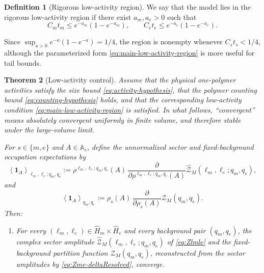 \documentclass[dvipsnames,a4paper]{article}
\numberwithin{equation}{section}
\newtheorem{theorem}{Theorem}[section]
\theoremstyle{definition}
\newtheorem{definition}[theorem]{Definition}
\theoremstyle{remark}
\begin{document}
\begin{definition}[Rigorous low-activity region]
	\label{def:low-activity-region}
	We say that the model lies in the rigorous low-activity region if there exist
	\(a_m,a_e>0\) such that
	\begin{equation}
		C_m t_m \le e^{-a_m}(1-e^{-a_m}),
		\qquad
		C_e t_e \le e^{-a_e}(1-e^{-a_e}).
		\label{eq:main-low-activity-region}
	\end{equation}
\end{definition}

Since \(\sup_{a>0}e^{-a}(1-e^{-a})=1/4\), the region is nonempty whenever
\(C_s t_s<1/4\), although the parameterized form
\eqref{eq:main-low-activity-region} is more useful for tail bounds.



\begin{theorem}[Low-activity control]
	\label{thm:low-activity-region}
	Assume that the physical one-polymer activities satisfy the size bound
	\eqref{eq:activity-hypothesis}, that the polymer counting bound
	\eqref{eq:counting-hypothesis} holds, and that the corresponding low-activity
	condition \eqref{eq:main-low-activity-region} is satisfied. In what follows,
	``convergent'' means absolutely convergent uniformly in finite volume, and therefore
	stable under the large-volume limit.
	
	For \(s\in\{m,e\}\) and \(A\in\mathbb A_s\), define the unnormalized sector and
	fixed-background occupation expectations by
	\begin{equation}
		\left\langle \mathbf 1_A \right\rangle_{\ell_m,\ell_e;q_m,q_e}
		:=
		\rho^{\ell_m,\ell_e;q_m,q_e}(A)\,
		\frac{\partial}{\partial \rho^{\ell_m,\ell_e;q_m,q_e}(A)}
		\widehat{\mathcal Z}_M(\ell_m,\ell_e;q_m,q_e),
		\label{eq:physical-sector-occupancy}
	\end{equation}
	and
	\begin{equation}
		\left\langle \mathbf 1_A \right\rangle_{q_m,q_e}
		:=
		\rho_s(A)\,
		\frac{\partial}{\partial \rho_s(A)}
		\mathcal Z_M(q_m,q_e).
		\label{eq:physical-fixed-background-occupancy}
	\end{equation}
	Then:
	\begin{enumerate}[label=(\roman*)]
		\item \label{thmItem:Zfinite}
		For every \((\ell_m,\ell_e)\in\widehat H_m\times\widehat H_e\) and every
		background pair \((q_m,q_e)\), the complex sector amplitude
		\(\widehat{\mathcal Z}_M(\ell_m,\ell_e;q_m,q_e)\) of \eqref{eq:Zlmle} and the
		fixed-background partition function \(\mathcal Z_M(q_m,q_e)\), reconstructed from
		the sector amplitudes by \eqref{eq:Zme-deltaResolved}, converge.
		

\end{enumerate}
\end{theorem}
\end{document}
